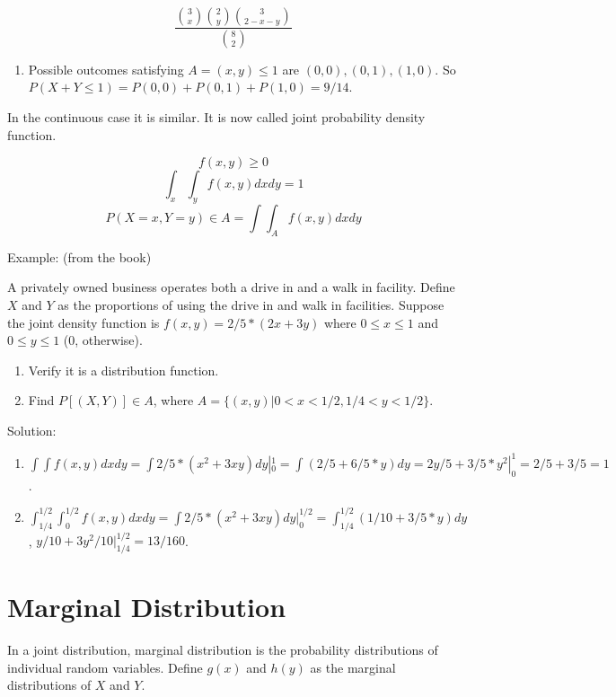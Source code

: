 \documentclass[]{book}
\providecommand{\tightlist}{%
  \setlength{\itemsep}{0pt}\setlength{\parskip}{0pt}}
\theoremstyle{definition}
\theoremstyle{definition}
\theoremstyle{definition}
\theoremstyle{remark}
\begin{document}
\[\dfrac{\binom{3}{x}\binom{2}{y}\binom{3}{2-x-y}}{\binom{8}{2}}\]

\begin{enumerate}
\def\labelenumi{\alph{enumi}.}
\setcounter{enumi}{1}
\tightlist
\item
  Possible outcomes satisfying \(A = (x,y) \le 1\) are
  \((0,0),(0,1),(1,0)\). So
  \(P(X+Y \le 1) = P(0,0) + P(0,1) + P(1,0) = 9/14\).
\end{enumerate}

In the continuous case it is similar. It is now called joint probability
density function.

\[f(x,y) \ge 0\] \[\int_x\int_y f(x,y)dxdy = 1\]
\[P(X=x,Y=y) \in A = \int\int_A f(x,y)dxdy\]

Example: (from the book)

A privately owned business operates both a drive in and a walk in
facility. Define \(X\) and \(Y\) as the proportions of using the drive
in and walk in facilities. Suppose the joint density function is
\(f(x,y) = 2/5*(2x+3y)\) where \(0 \le x \le 1\) and \(0 \le y \le 1\)
(0, otherwise).

\begin{enumerate}
\def\labelenumi{\alph{enumi}.}
\tightlist
\item
  Verify it is a distribution function.
\item
  Find \(P[(X,Y)] \in A\), where
  \(A = \{(x,y)|0 < x < 1/2, 1/4 < y < 1/2\}\).
\end{enumerate}

Solution:

\begin{enumerate}
\def\labelenumi{\alph{enumi}.}
\item
  \(\int\int f(x,y)dxdy = \int 2/5*(x^2 + 3xy)dy|_0^1 = \int (2/5 + 6/5*y)dy = 2y/5 + 3/5*y^2 |^1_0 = 2/5 + 3/5 = 1\).
\item
  \(\int_{1/4}^{1/2}\int_0^{1/2} f(x,y)dxdy = \int 2/5*(x^2 + 3xy)dy|_0^{1/2} = \int_{1/4}^{1/2} (1/10 + 3/5*y) dy\),
  \(y/10 + 3y^2/10|_{1/4}^{1/2} = 13/160\).
\end{enumerate}

\hypertarget{marginal-distribution}{%
\section{Marginal Distribution}\label{marginal-distribution}}

In a joint distribution, marginal distribution is the probability
distributions of individual random variables. Define \(g(x)\) and
\(h(y)\) as the marginal distributions of \(X\) and \(Y\).
\end{document}
